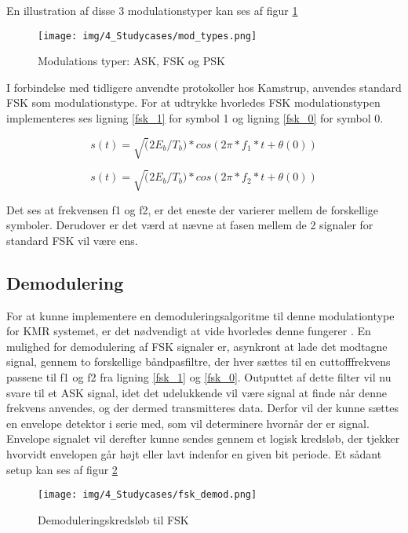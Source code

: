 \begin{appendices}
En illustration af disse 3 modulationstyper \cite{modulation-types} kan ses af figur \ref{fig:mod_types}

\begin{figure}[H]
	\centering{}
	\texttt{[image: img/4\_Studycases/mod\_types.png]}
	\caption{Modulations typer: ASK, FSK og PSK}
	\label{fig:mod_types}
\end{figure} 

I forbindelse med tidligere anvendte protokoller hos Kamstrup, anvendes standard FSK som modulationstype. For at udtrykke hvorledes FSK modulationstypen implementeres ses ligning \ref{fsk_1} for symbol 1 og ligning \ref{fsk_0} for symbol 0. 

\begin{equation} \label{fsk_1}
s(t) = \sqrt(2E_b / T_b) * cos(2 \pi * f_1 * t + \theta(0))
\end{equation}

\begin{equation} \label{fsk_0}
s(t) = \sqrt(2E_b / T_b) * cos(2 \pi * f_2 * t + \theta(0))
\end{equation}

Det ses at frekvensen f1 og f2, er det eneste der varierer mellem de forskellige symboler. Derudover er det værd at nævne at fasen mellem de 2 signaler for standard FSK vil være ens. 

\pagebreak

\subsection{Demodulering}
For at kunne implementere en demoduleringsalgoritme til denne modulationtype for KMR systemet, er det nødvendigt at vide hvorledes denne fungerer \cite{modulation-types}. En mulighed for demodulering af FSK signaler er, asynkront at lade det modtagne signal, gennem to forskellige båndpasfiltre, der hver sættes til en cuttofffrekvens passene til f1 og f2 fra ligning \ref{fsk_1} og \ref{fsk_0}. Outputtet af dette filter vil nu svare til et ASK signal, idet det udelukkende vil være signal at finde når denne frekvens anvendes, og der dermed transmitteres data. Derfor vil der kunne sættes en envelope detektor i serie med, som vil determinere hvornår der er signal. Envelope signalet vil derefter kunne sendes gennem et logisk kredsløb, der tjekker hvorvidt envelopen går højt eller lavt indenfor en given bit periode. Et sådant setup kan ses af figur \ref{fig:fsk_demod}

\begin{figure}[H]
	\centering{}
	\texttt{[image: img/4\_Studycases/fsk\_demod.png]}
	\caption{Demoduleringskredsløb til FSK}
	\label{fig:fsk_demod}
\end{figure} 


\end{appendices}
